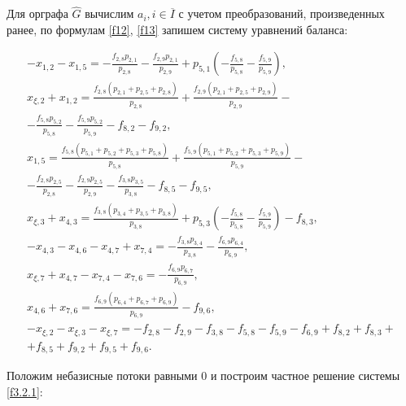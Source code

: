 \documentclass[14pt]{extarticle}%
\begin{document}
Для орграфа $\widehat{G}$ вычислим $a_i, i\in \overline{I}$ с учетом преобразований, произведенных ранее, по формулам \eqref{f12}, \eqref{f13} запишем систему уравнений баланса:

\begin{equation}\begin{gathered}\label{f3.2.1}
-x_{1,2}-x_{1,5}=-\frac{f_{2,8} p_{2,1}}{p_{2,8}}-\frac{f_{2,9} p_{2,1}}{p_{2,9}}+p_{5,1} \left(-\frac{f_{5,8}}{p_{5,8}}-\frac{f_{5,9}}{p_{5,9}}\right),\\
    x_{\xi ,2}+x_{1,2}=\frac{f_{2,8} \left(p_{2,1}+p_{2,5}+p_{2,8}\right)}{p_{2,8}}+\frac{f_{2,9} \left(p_{2,1}+p_{2,5}+p_{2,9}\right)}{p_{2,9}}-\\-\frac{f_{5,8} p_{5,2}}{p_{5,8}}-\frac{f_{5,9} p_{5,2}}{p_{5,9}}-f_{8,2}-f_{9,2},\\
    x_{1,5}=\frac{f_{5,8} \left(p_{5,1}+p_{5,2}+p_{5,3}+p_{5,8}\right)}{p_{5,8}}+\frac{f_{5,9} \left(p_{5,1}+p_{5,2}+p_{5,3}+p_{5,9}\right)}{p_{5,9}}-\\-\frac{f_{2,8} p_{2,5}}{p_{2,8}}-\frac{f_{2,9} p_{2,5}}{p_{2,9}}-\frac{f_{3,8} p_{3,5}}{p_{3,8}}-f_{8,5}-f_{9,5},\\
    x_{\xi ,3}+x_{4,3}=\frac{f_{3,8} \left(p_{3,4}+p_{3,5}+p_{3,8}\right)}{p_{3,8}}+p_{5,3} \left(-\frac{f_{5,8}}{p_{5,8}}-\frac{f_{5,9}}{p_{5,9}}\right)-f_{8,3},\\
    -x_{4,3}-x_{4,6}-x_{4,7}+x_{7,4}=-\frac{f_{3,8} p_{3,4}}{p_{3,8}}-\frac{f_{6,9} p_{6,4}}{p_{6,9}},\\
    x_{\xi ,7}+x_{4,7}-x_{7,4}-x_{7,6}=-\frac{f_{6,9} p_{6,7}}{p_{6,9}},\\
    x_{4,6}+x_{7,6}=\frac{f_{6,9} \left(p_{6,4}+p_{6,7}+p_{6,9}\right)}{p_{6,9}}-f_{9,6},\\
    -x_{\xi ,2}-x_{\xi ,3}-x_{\xi ,7}=-f_{2,8}-f_{2,9}-f_{3,8}-f_{5,8}-f_{5,9}-f_{6,9}+f_{8,2}+f_{8,3}+\\+f_{8,5}+f_{9,2}+f_{9,5}+f_{9,6}.
    \end{gathered}
\end{equation}

Положим небазисные потоки равными 0 и построим частное решение системы \eqref{f3.2.1}:
\end{document}
